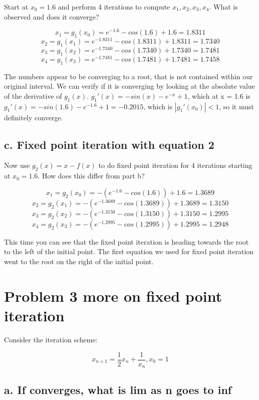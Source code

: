 \documentclass[]{article}
\begin{document}
Start at \(x_0 = 1.6\) and perform 4 iterations to compute
\(x_1, x_2, x_3, x_4\). What is observed and does it converge?

\[x_1 = g_1(x_0) =  e^{-1.6}-cos(1.6) + 1.6 = 1.8311\]
\[x_2 = g_1(x_1) =  e^{-1.8311}-cos(1.8311) + 1.8311 = 1.7340\]
\[x_3 = g_1(x_2) =  e^{-1.7340}-cos(1.7340) + 1.7340 = 1.7481\]
\[x_4 = g_1(x_3) =  e^{-1.7481}-cos(1.7481) + 1.7481 = 1.7458\]

The numbers appear to be converging to a root, that is not contained
within our original interval. We can verify if it is converging by
looking at the absolute value of the derivative of \(g_1(x)\).
\(g_1'(x) = -sin(x) - e^{-x}+1\), which at x = 1.6 is
\(g_1'(x) = -sin(1.6) - e^{-1.6}+1 = -0.2015\), which is
\(|g_1'(x_0)| < 1\), so it must definitely converge.

\hypertarget{c.-fixed-point-iteration-with-equation-2}{%
\subsection{c. Fixed point iteration with equation
2}\label{c.-fixed-point-iteration-with-equation-2}}

Now use \(g_2(x) = x - f(x)\) to do fixed point iteration for 4
iterations starting at \(x_0 = 1.6\). How does this differ from part b?

\[x_1 = g_2(x_0) =  -(e^{-1.6}-cos(1.6)) + 1.6 = 1.3689\]
\[x_2 = g_2(x_1) =  -(e^{-1.3689}-cos(1.3689)) + 1.3689 = 1.3150\]
\[x_3 = g_2(x_2) =  -(e^{-1.3150}-cos(1.3150)) + 1.3150 = 1.2995\]
\[x_4 = g_2(x_3) =  -(e^{-1.2995}-cos(1.2995)) + 1.2995 = 1.2948\]

This time you can see that the fixed point iteration is heading towards
the root to the left of the initial point. The first equation we used
for fixed point iteration went to the root on the right of the initial
point.

\hypertarget{problem-3-more-on-fixed-point-iteration}{%
\section{Problem 3 more on fixed point
iteration}\label{problem-3-more-on-fixed-point-iteration}}

Consider the iteration scheme:

\[x_{n+1} = \frac12x_n + \frac1{x_n}, x_0 = 1\]

\hypertarget{a.-if-converges-what-is-lim-as-n-goes-to-inf}{%
\subsection{a. If converges, what is lim as n goes to
inf}\label{a.-if-converges-what-is-lim-as-n-goes-to-inf}}
\end{document}
